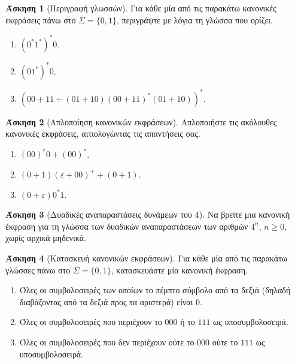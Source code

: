 \documentclass[11pt,a4paper]{article}
\newcommand{\eps}{\varepsilon}
\theoremstyle{definition}
\newtheorem{question}{Άσκηση}
\begin{document}
\begin{question}[Περιγραφή γλωσσών]
Για κάθε μία από τις παρακάτω κανονικές εκφράσεις πάνω στο
$\Sigma=\{0,1\}$, περιγράψτε με λόγια τη γλώσσα που ορίζει.
\begin{enumerate}
\item $(0^*1^*)^*0$.
\item $(01^*)^*0$.
\item $(00+11+(01+10)(00+11)^*(01+10))^*$.
\end{enumerate}
\end{question}

\begin{question}[Απλοποίηση κανονικών εκφράσεων]
Απλοποιήστε τις ακόλουθες κανονικές εκφράσεις,
αιτιολογώντας τις απαντήσεις σας.
\begin{enumerate}
\item $(00)^*0+(00)^*$.
\item $(0+1)(\eps+00)^+ +(0+1)$.
\item $(0+\eps)0^*1$.
\end{enumerate}
\end{question}

\begin{question}[Δυαδικές αναπαραστάσεις δυνάμεων του 4]
Να βρείτε μια κανονική έκφραση για τη γλώσσα των
δυαδικών αναπαραστάσεων των αριθμών $4^n$, $n\ge 0$,
χωρίς αρχικά μηδενικά.
\end{question}

\begin{question}[Κατασκευή κανονικών εκφράσεων]
Για κάθε μία από τις παρακάτω γλώσσες πάνω στο
$\Sigma=\{0,1\}$, κατασκευάστε μία κανονική έκφραση.
\begin{enumerate}
\item Όλες οι συμβολοσειρές των οποίων το πέμπτο
σύμβολο από τα δεξιά (δηλαδή διαβάζοντας από τα δεξιά προς τα αριστερά) είναι $0$.
\item Όλες οι συμβολοσειρές που περιέχουν το $000$
ή το $111$ ως υποσυμβολοσειρά.
\item Όλες οι συμβολοσειρές που δεν περιέχουν
ούτε το $000$ ούτε το $111$ ως υποσυμβολοσειρά.
\end{enumerate}
\end{question}
\end{document}
